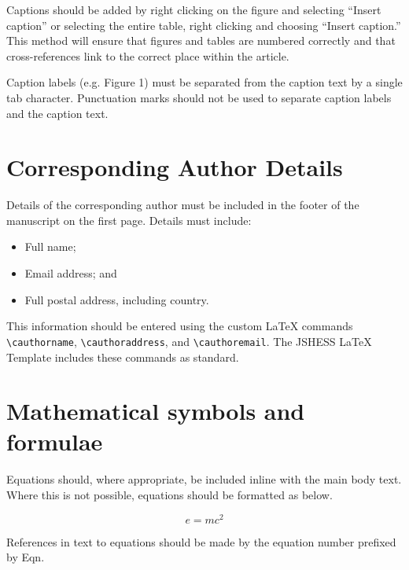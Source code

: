 \documentclass[10pt]{article}
\begin{document}
Captions should be added by right clicking on the figure and selecting “Insert caption” or selecting the entire table, right clicking and choosing “Insert caption.” This method will ensure that figures and tables are numbered correctly and that cross-references link to the correct place within the article.

Caption labels (e.g. Figure 1) must be separated from the caption text by a single tab character. Punctuation marks should not be used to separate caption labels and the caption text.

\section{Corresponding Author Details}
\label{CorrespondingAuthorDetails}
Details of the corresponding author must be included in the footer of the manuscript on the first page. Details must include:

\begin{itemize}
  \item Full name;
  \item Email address; and
  \item Full postal address, including country.
\end{itemize}

This information should be entered using the custom LaTeX commands \verb|\cauthorname|, \verb|\cauthoraddress|, and \verb|\cauthoremail|. The JSHESS LaTeX Template includes these commands as standard.

\section{Mathematical symbols and formulae}
\label{MathematicalSymbolsFormualae}
Equations should, where appropriate, be included inline with the main body text. Where this is not possible, equations should be formatted as below.

\begin{equation}
e = mc^2
\end{equation}

References in text to equations should be made by the equation number prefixed by Eqn.
\end{document}
